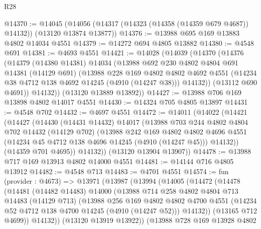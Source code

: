 \begin{lexlean}{R28}
\begin{coremodule}
@14370 := @14045
    (@14056 (@14317 (@14323 (@14358 (@14359 @679 @4687)) @14132)) (@13120 @13874 @13877))
@14376 := @13988 @695 @169 @13883 @4802 @14034 @4551
@14379 := @14272 @694 @4805 @13882
@14380 := @4548 @691
@14381 := @4693 @4551
@14421 := @14028
    (@14039
      (@14370
        (@14376
          (@14379
            (@14380 @14381)
            @14034
            (@13988
              @692
              @230
              @4802
              @4804
              @691
              @14381
              (@14129 @691)
              (@13988
                @228
                @169
                @4802
                @4802
                @4692
                @4551
                (@14234 @38 @4712 @138 @4692 @14245 (@4910 (@14247 @38)))
                @14132))
            (@13112 @690 @4691))
          @14132))
      (@13120 @13889 @13892))
@14427 := @13988 @706 @169 @13898 @4802 @14017 @4551
@14430 := @14324 @705 @4805 @13897
@14431 := @4548 @702
@14432 := @4697 @4551
@14472 := @14011
    (@14022
      (@14421
        (@14427
          (@14430
            (@14431 @14432)
            @14017
            (@13988
              @703
              @244
              @4802
              @4804
              @702
              @14432
              (@14129 @702)
              (@13988
                @242
                @169
                @4802
                @4802
                @4696
                @4551
                (@14234 @45 @4712 @138 @4696 @14245 (@4910 (@14247 @45)))
                @14132))
            (@14359 @701 @4695))
          @14132))
      (@13120 @13904 @13907))
@14478 := @13988 @717 @169 @13913 @4802 @14000 @4551
@14481 := @14144 @716 @4805 @13912
@14482 := @4548 @713
@14483 := @4701 @4551
@14574 := fun (provider : @4673) =>
  @13971
    (@13987
      (@13994
        (@14005
          (@14472
            (@14478
              (@14481
                (@14482 @14483)
                @14000
                (@13988
                  @714
                  @258
                  @4802
                  @4804
                  @713
                  @14483
                  (@14129 @713)
                  (@13988
                    @256
                    @169
                    @4802
                    @4802
                    @4700
                    @4551
                    (@14234 @52 @4712 @138 @4700 @14245 (@4910 (@14247 @52)))
                    @14132))
                (@13165 @712 @4699))
              @14132))
          (@13120 @13919 @13922))
        (@13988
          @728
          @169
          @13928
          @4802

\end{coremodule}
\end{lexlean}

